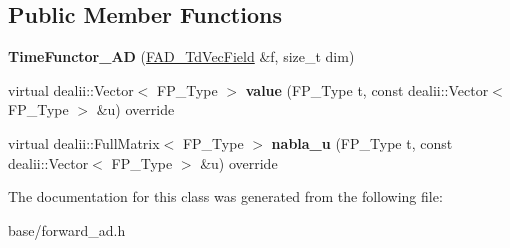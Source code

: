 \subsection*{Public Member Functions}
\begin{DoxyCompactItemize}
\item 
\mbox{\label{classTimeFunctor__AD_a538834d6d768d4736dea3b9033435f49}} 
{\bfseries Time\+Functor\+\_\+\+AD} (\hyperlink{structFAD__TdVecField}{F\+A\+D\+\_\+\+Td\+Vec\+Field} \&f, size\+\_\+t dim)
\item 
\mbox{\label{classTimeFunctor__AD_ab4e944ebc8519df564e579ef1a3b0e70}} 
virtual dealii\+::\+Vector$<$ F\+P\+\_\+\+Type $>$ {\bfseries value} (F\+P\+\_\+\+Type t, const dealii\+::\+Vector$<$ F\+P\+\_\+\+Type $>$ \&u) override
\item 
\mbox{\label{classTimeFunctor__AD_a02ae47ef08f47fdd91160cbce0277022}} 
virtual dealii\+::\+Full\+Matrix$<$ F\+P\+\_\+\+Type $>$ {\bfseries nabla\+\_\+u} (F\+P\+\_\+\+Type t, const dealii\+::\+Vector$<$ F\+P\+\_\+\+Type $>$ \&u) override
\end{DoxyCompactItemize}


The documentation for this class was generated from the following file\+:\begin{DoxyCompactItemize}
\item 
base/forward\+\_\+ad.\+h\end{DoxyCompactItemize}
